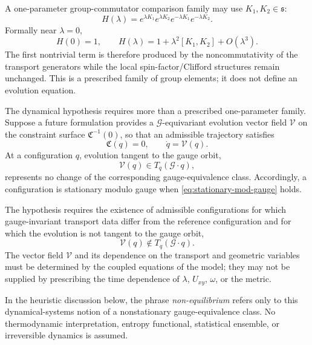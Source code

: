 \documentclass[11pt,a4paper]{article}
\theoremstyle{remark}
\newcommand{\cG}{\mathcal G}
\begin{document}
A one-parameter group-commutator comparison family may use \(K_1,K_2\in\mathfrak s\):
\begin{equation}
  H(\lambda)
  =e^{\lambda K_1}e^{\lambda K_2}
   e^{-\lambda K_1}e^{-\lambda K_2}.
\tag{3.23}\label{eq:group-commutator-family}
\end{equation}
Formally near \(\lambda=0\),
\begin{equation}
  H(0)=1,
  \qquad
  H(\lambda)=1+\lambda^2[K_1,K_2]+O(\lambda^3).
\tag{3.24}\label{eq:group-commutator-leading}
\end{equation}
The first nontrivial term is therefore produced by the noncommutativity of the transport generators while the local spin-factor/Clifford structures remain unchanged.  This is a prescribed family of group elements; it does not define an evolution equation.

The dynamical hypothesis requires more than a prescribed one-parameter family.  Suppose a future formulation provides a \(\cG\)-equivariant evolution vector field \(\mathcal V\) on the constraint surface \(\mathfrak C^{-1}(0)\), so that an admissible trajectory satisfies
\begin{equation}
  \mathfrak C(q)=0,
  \qquad
  \dot q=\mathcal V(q).
\tag{3.25}\label{eq:constrained-evolution}
\end{equation}
At a configuration \(q\), evolution tangent to the gauge orbit,
\begin{equation}
  \mathcal V(q)\in T_q(\cG\!\cdot q),
\tag{3.26}\label{eq:stationary-mod-gauge}
\end{equation}
represents no change of the corresponding gauge-equivalence class.  Accordingly, a configuration is stationary modulo gauge when \eqref{eq:stationary-mod-gauge} holds.

The hypothesis requires the existence of admissible configurations for which gauge-invariant transport data differ from the reference configuration and for which the evolution is not tangent to the gauge orbit,
\begin{equation}
  \mathcal V(q)\notin T_q(\cG\!\cdot q).
\tag{3.27}\label{eq:nonstationary-mod-gauge}
\end{equation}
The vector field \(\mathcal V\) and its dependence on the transport and geometric variables must be determined by the coupled equations of the model; they may not be supplied by prescribing the time dependence of \(\lambda\), \(U_{xy}\), \(\omega\), or the metric.

In the heuristic discussion below, the phrase \emph{non-equilibrium} refers only to this dynamical-systems notion of a nonstationary gauge-equivalence class.  No thermodynamic interpretation, entropy functional, statistical ensemble, or irreversible dynamics is assumed.
\end{document}
